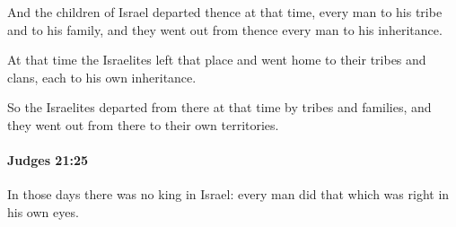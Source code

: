 			\begin{versebox}
					\item[BHS] 
					\item[ASV] And the children of Israel departed thence at that time, every man to his tribe and to his family, and they went out from thence every man to his inheritance.
					\item[NIV] At that time the Israelites left that place and went home to their tribes and clans, each to his own inheritance.
					\item[NRSV] So the Israelites departed from there at that time by tribes and families, and they went out from there to their own territories.
			\end{versebox}

		\paragraph{Judges 21:25} %
			\label{JUDGES-21-25}

			In those days there was no king in Israel: every man did that which was right in his own eyes.

